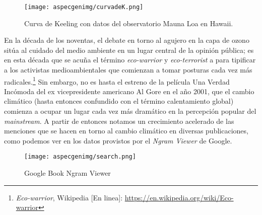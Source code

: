 \documentclass[12pt]{article}
\begin{document}
\begin{figure}[H]
\centering
\texttt{[image: aspecgenimg/curvadeK.png]}
\caption*{Curva de Keeling con datos del observatorio Mauna Loa en Hawaii.}
\end{figure}

En la década de los noventas, el debate en torno al agujero en la capa de ozono sitúa al cuidado del medio ambiente en un lugar central de la opinión pública; es en esta década que se acuña el término \textit{eco-warrior} y \textit{eco-terrorist} a para tipificar a los activistas medioambientales que comienzan a tomar posturas cada vez más radicales.\footnote{\textit{Eco-warrior}, Wikipedia [En linea]: \url{https://en.wikipedia.org/wiki/Eco-warrior}} Sin embargo, no es hasta el estreno de la película Una Verdad Incómoda del ex vicepresidente americano Al Gore en el año 2001, que el cambio climático (hasta entonces confundido con el término calentamiento global) comienza a ocupar un lugar cada vez más dramático en la percepción popular del \textit{mainstream}. A partir de entonces notamos un crecimiento acelerado de las menciones que se hacen en torno al cambio climático en diversas publicaciones, como podemos ver en los datos provistos por el \textit{Ngram Viewer} de Google.


\begin{figure}[H]
\centering
\texttt{[image: aspecgenimg/search.png]}
\caption*{Google Book Ngram Viewer\footnotemark}
\end{figure}

\end{document}
